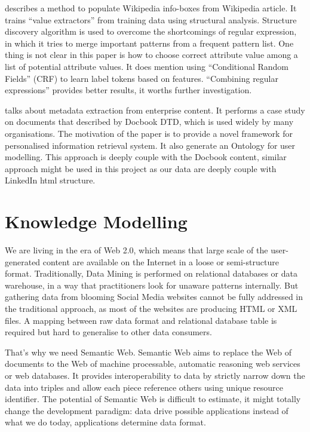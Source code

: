\cite{lange2010} describes a method to populate Wikipedia info-boxes from Wikipedia article. It trains ``value extractors'' from training data using structural analysis. Structure discovery algorithm is used to overcome the shortcomings of regular expression, in which it tries to merge important patterns from a frequent pattern list. One thing is not clear in this paper is how to choose correct attribute value among a list of potential attribute values. It does mention using ``Conditional Random Fields'' (CRF) to learn label tokens based on features. ``Combining regular expressions'' provides better results, it worths further investigation.

\cite{sah2010} talks about metadata extraction from enterprise content. It performs a case study on documents that described by Docbook DTD, which is used widely by many organisations. The motivation of the paper is to provide a novel framework for personalised information retrieval system. It also generate an Ontology for user modelling. This approach is deeply couple with the Docbook content, similar approach might be used in this project as our data are deeply couple with LinkedIn html structure.


\section{Knowledge Modelling}

We are living in the era of Web 2.0, which means that large scale of the user-generated content are available on the Internet in a loose or semi-structure format.  Traditionally, Data Mining is performed on relational databases or data warehouse, in a way that practitioners look for unaware patterns internally.  But gathering data from blooming Social Media websites cannot be fully addressed in the traditional approach, as most of the websites are producing HTML or XML files. A mapping between raw data format and relational database table is required but hard to generalise to other data consumers.  

That's why we need Semantic Web. Semantic Web aims to replace the Web of documents to the Web of machine processable, automatic reasoning web services or web databases. It provides interoperability to data by strictly narrow down the data into triples and allow each piece reference others using unique resource identifier. The potential of Semantic Web is difficult to estimate, it might totally change the development paradigm\cite{bergman2009advantages}: data drive possible applications instead of what we do today, applications determine data format.

